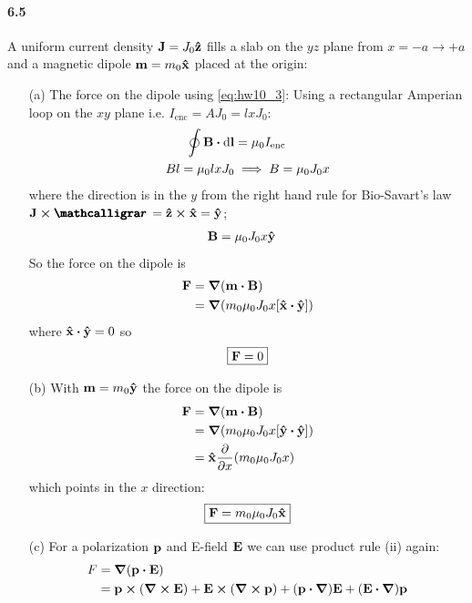 \documentclass[../main.tex]{subfiles}
\begin{document}
\paragraph{6.5} A uniform current density $\vb J = J_0 \vu z$ fills a slab on the
$yz$ plane from $x = -a \to +a$ and a magnetic dipole $\vb m = m_0 \vu x$ placed at the origin:
\begin{itemize}
    \item [(a)] The force on the dipole using \eqref{eq:hw10_3}: Using a rectangular Amperian loop on the $xy$ plane i.e. $I_\text{enc} = A J_0 = lx J_0$:
    \begin{align*}
        \oint \vb B \vdot \dd{\vb l} &= \mu_0 I_\text{enc} \\
        B l = \mu_0 l x J_0 &\implies B = \mu_0 J_0 x
    \end{align*}
    where the direction is in the $y$ from the right hand rule for Bio-Savart's law $\vb J \cross \boldscriptr = \vu z \cross \vu x = \vu y$; 
    \begin{align*}
        \vb B &= \mu_0 J_0 x \vu y
    \end{align*}
    So the force on the dipole is
    \begin{align*}
        \vb F &= \grad(\vb m \vdot \vb B) \\
        &= \grad(m_0 \mu_0 J_0 x [\vu x \vdot \vu y])
    \end{align*}
    where $\vu x \vdot \vu y = 0$ so
    \begin{align*}
        \boxed{\vb F = 0}
    \end{align*}
    \item [(b)] With $\vb m = m_0 \vu y$ the force on the dipole is
    \begin{align*}
        \vb F &= \grad(\vb m \vdot \vb B) \\
        &= \grad(m_0 \mu_0 J_0 x [\vu y \vdot \vu y]) \\
        &= \vu x \pdv{x}(m_0 \mu_0 J_0 x)
    \end{align*}
    which points in the $x$ direction:
    \begin{align*}
        \boxed{\vb F = m_0 \mu_0 J_0 \vu x}
    \end{align*}
    \item [(c)] For a polarization $\vb p$ and E-field $\vb E$ we can use product rule (ii) again:
    \begin{align*}
        F &= \grad(\vb p \vdot \vb E) \\
        &= \vb p \cross (\curl \vb E) + \vb E \cross (\curl \vb p) + (\vb p \vdot \grad) \vb E + (\vb E \vdot \grad) \vb p

\end{align*}
\end{itemize}
\end{document}
